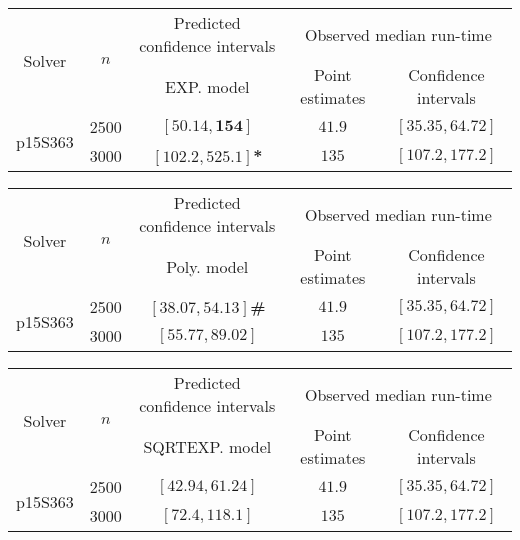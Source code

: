 \begin{tabular}{ccccc}
\hline 
\multirow{2}{*}{Solver} & \multirow{2}{*}{$n$} & Predicted confidence intervals & \multicolumn{2}{c}{Observed median run-time}\tabularnewline
 &  & EXP. model  & Point estimates  & Confidence intervals\tabularnewline
\hline 
\hline 
\multirow{2}{*}{p15S363} & 2500 & $\mathbf{\left[50.14,154\right]}$ & $41.9$ & $\left[35.35,64.72\right]$ \tabularnewline 
 & 3000 & $\mathbf{\left[102.2,525.1\right]}$\textbf{*} & $135$ & $\left[107.2,177.2\right]$ \tabularnewline 
\hline 
\end{tabular} 

\begin{tabular}{ccccc}
\hline 
\multirow{2}{*}{Solver} & \multirow{2}{*}{$n$} & Predicted confidence intervals & \multicolumn{2}{c}{Observed median run-time}\tabularnewline
 &  & Poly. model  & Point estimates  & Confidence intervals\tabularnewline
\hline 
\hline 
\multirow{2}{*}{p15S363} & 2500 & $\mathbf{\left[38.07,54.13\right]}$\textbf{\#} & $41.9$ & $\left[35.35,64.72\right]$ \tabularnewline 
 & 3000 & $\left[55.77,89.02\right]$ & $135$ & $\left[107.2,177.2\right]$ \tabularnewline 
\hline 
\end{tabular} 

\begin{tabular}{ccccc}
\hline 
\multirow{2}{*}{Solver} & \multirow{2}{*}{$n$} & Predicted confidence intervals & \multicolumn{2}{c}{Observed median run-time}\tabularnewline
 &  & SQRTEXP. model  & Point estimates  & Confidence intervals\tabularnewline
\hline 
\hline 
\multirow{2}{*}{p15S363} & 2500 & $\mathbf{\left[42.94,61.24\right]}$ & $41.9$ & $\left[35.35,64.72\right]$ \tabularnewline 
 & 3000 & $\mathbf{\left[72.4,118.1\right]}$ & $135$ & $\left[107.2,177.2\right]$ \tabularnewline 
\hline 
\end{tabular} 


